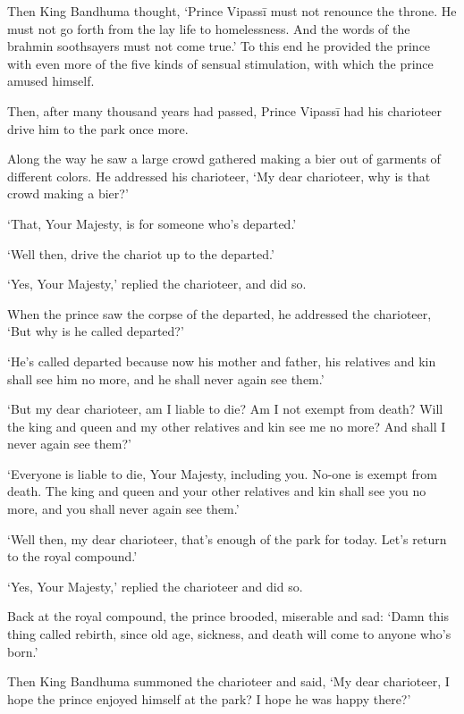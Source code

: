 \documentclass[12pt,openany]{book}%
\begin{document}
Then King Bandhuma thought, ‘Prince \textsanskrit{Vipassī} must not renounce the throne. He must not go forth from the lay life to homelessness. And the words of the brahmin soothsayers must not come true.’ To this end he provided the prince with even more of the five kinds of sensual stimulation, with which the prince amused himself. 

Then, after many thousand years had passed, Prince \textsanskrit{Vipassī} had his charioteer drive him to the park once more. 

Along the way he saw a large crowd gathered making a bier out of garments of different colors. He addressed his charioteer, ‘My dear charioteer, why is that crowd making a bier?’ 

‘That, Your Majesty, is for someone who’s departed.’ 

‘Well then, drive the chariot up to the departed.’ 

‘Yes, Your Majesty,’ replied the charioteer, and did so. 

When the prince saw the corpse of the departed, he addressed the charioteer, ‘But why is he called departed?’ 

‘He’s called departed because now his mother and father, his relatives and kin shall see him no more, and he shall never again see them.’ 

‘But my dear charioteer, am I liable to die? Am I not exempt from death? Will the king and queen and my other relatives and kin see me no more? And shall I never again see them?’ 

‘Everyone is liable to die, Your Majesty, including you. No-one is exempt from death. The king and queen and your other relatives and kin shall see you no more, and you shall never again see them.’ 

‘Well then, my dear charioteer, that’s enough of the park for today. Let’s return to the royal compound.’ 

‘Yes, Your Majesty,’ replied the charioteer and did so. 

Back at the royal compound, the prince brooded, miserable and sad: ‘Damn this thing called rebirth, since old age, sickness, and death will come to anyone who’s born.’ 

Then King Bandhuma summoned the charioteer and said, ‘My dear charioteer, I hope the prince enjoyed himself at the park? I hope he was happy there?’ 
\end{document}
